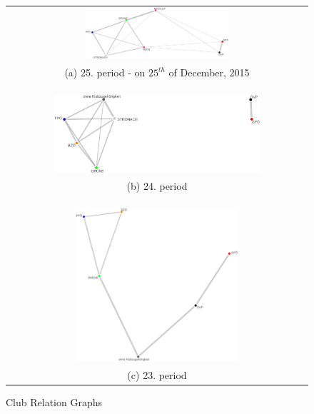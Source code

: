 \begin{figure}
	\center
	\begin{tabular}{ c }
		\includegraphics[width=0.49\textwidth]{imgs/graphs/club-graphs/horizontal/graph_25.eps}
		\\
		(a) 25. period - on $25^{th}$ of December, 2015
		\\
		\\
		\hline
		\\
		\\
		\includegraphics[width=0.7\textwidth]{imgs/graphs/club-graphs/horizontal/graph_24.eps}
		\\
		(b) 24. period
		\\
		\\
		\hline
		\\
		\\
		\includegraphics[width=0.55\textwidth]{imgs/graphs/club-graphs/horizontal/graph_23.eps}
		\\
		(c) 23. period
		
	\end{tabular}
	

	\caption{Club Relation Graphs}
	\label{fig:club_graphs1}
\end{figure}

